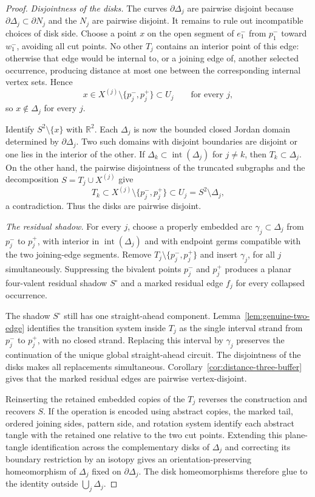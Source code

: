 \documentclass[9pt,twoside]{pnas-new}
\theoremstyle{definition}
\theoremstyle{remark}
\begin{document}
\begin{proof}
\emph{Disjointness of the disks.}
The curves $\partial\Delta_j$ are pairwise disjoint because $\partial\Delta_j\subset\partial N_j$ and the $N_j$ are pairwise disjoint. It remains to rule out incompatible choices of disk side. Choose a point $x$ on the open segment of $e_1^-$ from $p_1^-$ toward $w_1^-$, avoiding all cut points. No other $T_j$ contains an interior point of this edge: otherwise that edge would be internal to, or a joining edge of, another selected occurrence, producing distance at most one between the corresponding internal vertex sets. Hence
\[
 x\in X^{(j)}\setminus\{p_j^-,p_j^+\}\subset U_j
 \qquad\text{for every }j,
\]
so $x\notin\Delta_j$ for every $j$.

Identify $S^2\setminus\{x\}$ with $\mathbb R^2$. Each $\Delta_j$ is now the bounded closed Jordan domain determined by $\partial\Delta_j$. Two such domains with disjoint boundaries are disjoint or one lies in the interior of the other. If $\Delta_k\subset\operatorname{int}(\Delta_j)$ for $j\ne k$, then $T_k\subset\Delta_j$. On the other hand, the pairwise disjointness of the truncated subgraphs and the decomposition $S=T_j\cup X^{(j)}$ give
\[
 T_k\subset X^{(j)}\setminus\{p_j^-,p_j^+\}\subset U_j=S^2\setminus\Delta_j,
\]
a contradiction. Thus the disks are pairwise disjoint.

\emph{The residual shadow.}
For every $j$, choose a properly embedded arc $\gamma_j\subset\Delta_j$ from $p_j^-$ to $p_j^+$, with interior in $\operatorname{int}(\Delta_j)$ and with endpoint germs compatible with the two joining-edge segments. Remove $T_j\setminus\{p_j^-,p_j^+\}$ and insert $\gamma_j$, for all $j$ simultaneously. Suppressing the bivalent points $p_j^-$ and $p_j^+$ produces a planar four-valent residual shadow $S^\circ$ and a marked residual edge $f_j$ for every collapsed occurrence.

The shadow $S^\circ$ still has one straight-ahead component. Lemma~\ref{lem:genuine-two-edge} identifies the transition system inside $T_j$ as the single interval strand from $p_j^-$ to $p_j^+$, with no closed strand. Replacing this interval by $\gamma_j$ preserves the continuation of the unique global straight-ahead circuit. The disjointness of the disks makes all replacements simultaneous. Corollary~\ref{cor:distance-three-buffer} gives that the marked residual edges are pairwise vertex-disjoint.

Reinserting the retained embedded copies of the $T_j$ reverses the construction and recovers $S$. If the operation is encoded using abstract copies, the marked tail, ordered joining sides, pattern side, and rotation system identify each abstract tangle with the retained one relative to the two cut points. Extending this plane-tangle identification across the complementary disks of $\Delta_j$ and correcting its boundary restriction by an isotopy gives an orientation-preserving homeomorphism of $\Delta_j$ fixed on $\partial\Delta_j$. The disk homeomorphisms therefore glue to the identity outside $\bigcup_j\Delta_j$.


\end{proof}
\end{document}
